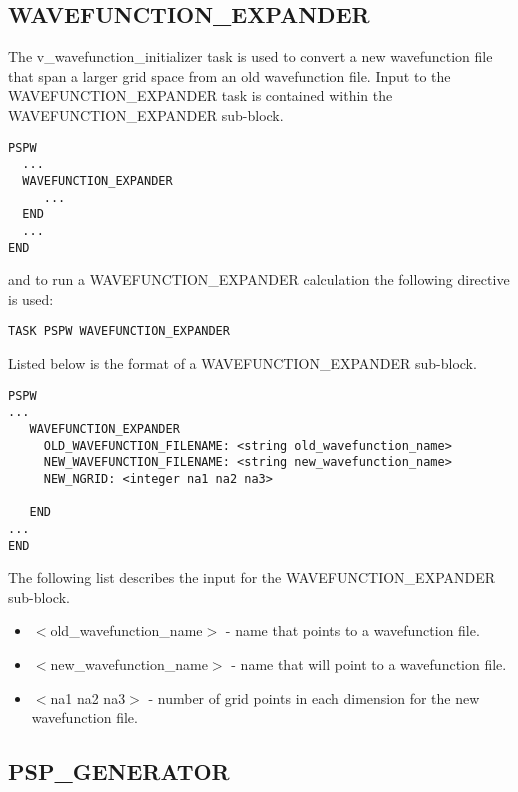 \subsection{WAVEFUNCTION\_EXPANDER}
The v\_wavefunction\_initializer task is used to convert a new wavefunction
file that span a larger grid space from an old wavefunction file.
Input to the WAVEFUNCTION\_EXPANDER task is contained
within the WAVEFUNCTION\_EXPANDER sub-block.
\begin{verbatim}
PSPW
  ...
  WAVEFUNCTION_EXPANDER
     ...
  END
  ...
END
\end{verbatim}
and to run a WAVEFUNCTION\_EXPANDER calculation the following directive 
is used:
\begin{verbatim}
TASK PSPW WAVEFUNCTION_EXPANDER
\end{verbatim}
Listed below is the format of a WAVEFUNCTION\_EXPANDER sub-block.
\begin{verbatim}
PSPW
... 
   WAVEFUNCTION_EXPANDER   
     OLD_WAVEFUNCTION_FILENAME: <string old_wavefunction_name>
     NEW_WAVEFUNCTION_FILENAME: <string new_wavefunction_name>
     NEW_NGRID: <integer na1 na2 na3>
    
   END
...
END
\end{verbatim}
The following list describes the input for the WAVEFUNCTION\_EXPANDER
sub-block.
\begin{itemize}
	\item $<$old\_wavefunction\_name$>$ - name that points
              to a wavefunction file.
	\item $<$new\_wavefunction\_name$>$ - name that will 
              point to a wavefunction file.
	\item $<$na1 na2 na3$>$ - number of grid points in each dimension
              for the new wavefunction file. 
\end{itemize}



\subsection{PSP\_GENERATOR}

